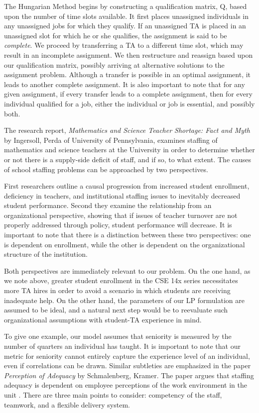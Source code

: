 \documentclass{article}
\begin{document}
\begin{multicols}{2}
The Hungarian Method begins by constructing a qualification matrix, Q, based upon the number of time slots available. It first places unassigned individuals in any unassigned jobs for which they qualify. If an unassigned TA is placed in an unassigned slot for which he or she qualifies, the assignment is said to be \textit{complete}. We proceed by transferring a TA to a different time slot, which may result in an incomplete assignment. We then restructure and reassign based upon our qualification matrix, possibly arriving at alternative solutions to the assignment problem. Although a transfer is possible in an optimal assignment, it leads to another complete assignment. It is also important to note that for any given assignment, if every transfer leads to a complete assignment, then for every individual qualified for a job, either the individual or job is essential, and possibly both\cite{kuhn}.

The research report, \textit{Mathematics and Science Teacher Shortage: Fact and Myth} by Ingersoll, Perda of University of Pennsylvania, examines staffing of mathematics and science teachers at the University in order to determine whether or not there is a supply-side deficit of staff, and if so, to what extent\cite{ingersoll}. The causes of school staffing problems can be approached by two perspectives.

First researchers outline a causal progression from increased student enrollment, deficiency in teachers, and institutional staffing issues to inevitably decreased student performance. Second they examine the relationship from an organizational perspective, showing that if issues of teacher turnover are not properly addressed through policy, student performance will decrease. It is important to note that there is a distinction between these two perspectives: one is dependent on enrollment, while the other is dependent on the organizational structure of the institution. 

Both perspectives are immediately relevant to our problem. On the one hand, as we note above, greater student enrollment in the CSE 14x series necessitates more TA hires in order to avoid a scenario in which students are receiving inadequate help. On the other hand, the parameters of our LP formulation are assumed to be ideal, and a natural next step would be to reevaluate such organizational assumptions with student-TA experience in mind.

To give one example, our model assumes that seniority is measured by the number of quarters an individual has taught. It is important to note that our metric for seniority cannot entirely capture the experience level of an individual, even if correlations can be drawn. Similar subtleties are emphasized in the paper \textit{Perception of Adequacy} by Schmalenberg, Kramer. The paper argues that staffing adequacy is dependent on employee perceptions of the work environment in the unit \cite{schmalenberg}. There are three main points to consider: competency of the staff, teamwork, and a flexible delivery system.


\end{multicols}
\end{document}
